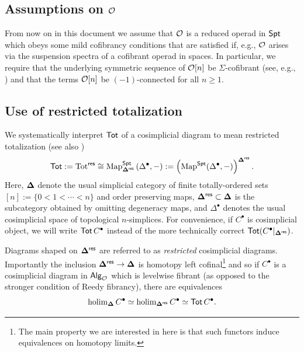 \subsection{Assumptions on $\mathcal{O}$} \label{cofibrancy} 
From now on in this document we assume that $\mathcal{O}$ is a reduced operad in $\mathsf{Spt}$ which obeys some mild cofibrancy conditions that are satisfied if, e.g.,  $\mathcal{O}$ arises via the suspension spectra of a cofibrant operad in spaces. In particular, we require that the underlying symmetric sequence of  $\mathcal{O}[n]$ be $\Sigma$-cofibrant (see, e.g.,  \cite[]{AC-1}) and that the terms $\mathcal{O}[n]$ be $(-1)$-connected for all $n \geq 1$. 



\subsection{Use of restricted totalization} \label{sec:Use-of-tot}
We systematically interpret $\operatorname{\mathsf{Tot}}$ of a cosimplicial diagram to mean restricted totalization (see also  \cite[]{Ching-Harper-Koszul}) \[\operatorname{\mathsf{Tot}}:=\mathrm{Tot}^{\mathsf{res}}\cong\operatorname{Map}_{\mathbf{\Delta}^{\mathsf{res}}}^{\mathsf{Spt}} \left( \Delta^{\bullet}, -\right):=\left(\operatorname{Map}^{\mathsf{Spt}}(\Delta^{\bullet},-)\right)^{\mathbf{\Delta}^{\mathsf{res}}}.\] Here, $\mathbf{\Delta}$ denote the usual simplicial category of finite totally-ordered sets $[n]:=\{0<1< \cdots<n\}$ and order preserving maps, $\mathbf{\Delta}^{\mathsf{res}}\subset \mathbf{\Delta}$ is the subcategory obtained by omitting degeneracy maps, and $\Delta^{\bullet}$ denotes the usual cosimplicial space of topological $n$-simplices. For convenience, if  $C^{\bullet}$ is cosimplicial object, we will write $\operatorname{\mathsf{Tot}} C^{\bullet}$ instead of the more technically correct $\operatorname{\mathsf{Tot}} (C^{\bullet}|_{\mathbf{\Delta}^{\mathsf{res}}})$.

Diagrams shaped on $\mathbf{\Delta}^{\mathsf{res}}$ are referred to as \textit{restricted} cosimplicial diagrams. Importantly the inclusion $\mathbf{\Delta}^{\mathsf{res}} \to \mathbf{\Delta}$ is homotopy left cofinal\footnote{The main property we are interested in here is that such functors induce equivalences on homotopy limits.} and so if $C^{\bullet}$ is a cosimplicial diagram in ${\mathsf{Alg}_{\mathcal{O}}}$ which is levelwise fibrant (as opposed to the stronger condition of Reedy fibrancy), there are equivalences  \[ \operatorname{holim}_{\mathbf{\Delta}} C^{\bullet}\simeq \operatorname{holim}_{\mathbf{\Delta}^{\mathsf{res}}} C^{\bullet}\simeq  \operatorname{\mathsf{Tot}} C^{\bullet}.\]

